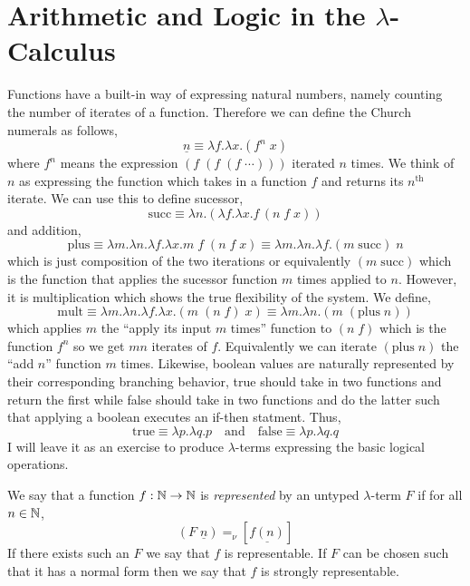 \documentclass[12pt]{article}
\begin{document}
\section{Arithmetic and Logic in the $\lambda$-Calculus}

Functions have a built-in way of expressing natural numbers, namely counting the number of iterates of a function. Therefore we can define the Church numerals as follows,
\[ \underline{n} \equiv \lambda f . \lambda x . (f^n \; x) \]
where $f^n$ means the expression $(f \; (f \; (f \; \cdots)))$ iterated $n$ times. We think of $n$ as expressing the function which takes in a function $f$ and returns its $n^{\text{th}}$ iterate. We can use this to define sucessor,
\[ \text{succ} \equiv \lambda n . (\lambda f . \lambda x. f \, (n \; f \; x)) \]
and addition,
\[ \text{plus} \equiv \lambda m . \lambda n. \lambda f. \lambda x . m \; f \; (n \; f \; x) \equiv \lambda m . \lambda n . \lambda f . (m \; \text{succ}) \; n\]
which is just composition of the two iterations or equivalently $(m \; \text{succ})$ which is the function that applies the sucessor function $m$ times applied to $n$. However, it is multiplication which shows the true flexibility of the system. We define,
\[ \text{mult} \equiv \lambda m . \lambda n . \lambda f . \lambda x . (m \; (n \; f) \; x) \equiv \lambda m . \lambda n . (m \; (\text{plus} \; n)) \]
which applies $m$ the ``apply its input $m$ times'' function to $(n \; f)$ which is the function $f^n$ so we get $mn$ iterates of $f$. Equivalently we can iterate $(\text{plus} \; n)$ the ``add $n$'' function $m$ times. 
Likewise, boolean values are naturally represented by their corresponding branching behavior, true should take in two functions and return the first while false should take in two functions and do the latter such that applying a boolean executes an if-then statment. Thus,
\[ \text{true} \equiv \lambda p . \lambda q . p \quad \text{and} \quad \text{false} \equiv \lambda p . \lambda q . q \]
I will leave it as an exercise to produce $\lambda$-terms expressing the basic logical operations. 

\begin{defn}
We say that a function $f : \mathbb{N} \to \mathbb{N}$ is \textit{represented} by an untyped $\lambda$-term $F$ if for all $n \in \mathbb{N}$,
\[ (F \; \underline{n}) =_{\nu} [\underline{f(n)}] \]
If there exists such an $F$ we say that $f$ is representable. If $F$ can be chosen such that it has a normal form then we say that $f$ is strongly representable.
\end{defn}
\end{document}
